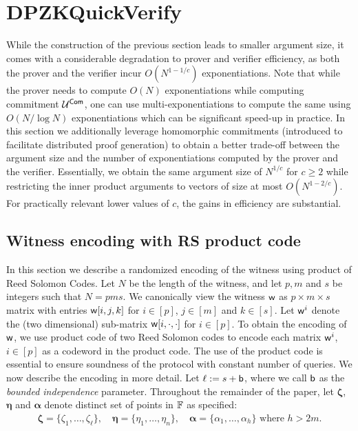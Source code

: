 \newcommand{\fft}{\mathsf{FFT}}
\newcommand{\ifft}{\mathsf{IFFT}}
\newcommand{\open}{\mathsf{Open}}

\section{DPZKQuickVerify} \label{sec:quickverify}
While the construction of the previous section leads to smaller argument size,
it comes with a considerable degradation to prover and verifier efficiency, as
both the prover and the verifier incur $O(N^{1-1/c})$ exponentiations. Note
that while the prover needs to compute $O(N)$ exponentiations while computing
commitment $\mathcal{U}^{\mathsf{Com}}$, one can use multi-exponentiations to compute the same
using $O(N/\log{N})$ exponentiations which can be significant speed-up in
practice. In this section we additionally leverage homomorphic commitments
(introduced to facilitate distributed proof generation) to obtain a better
trade-off between the argument size and the number of exponentiations computed
by the prover and the verifier. Essentially, we obtain the same argument size
of $N^{1/c}$ for $c\geq 2$ while restricting the inner product arguments to
vectors of size at most $O(N^{1-2/c})$. For practically relevant lower values
of $c$, the gains in efficiency are substantial.
   

\subsection{Witness encoding with RS product code}\label{sec:witencoding}
In this section we describe a randomized encoding of the witness using product
of Reed Solomon Codes. Let $N$ be the length of the witness, and let $p,m$ and
$s$ be integers such that $N=pms$. We canonically view the
witness $\mathsf{w}$ 
as $p\times m\times s$ matrix with entries $\mathsf{w}[i,j,k]$ for $i\in [p]$,
$j\in [m]$ and $k\in [s]$. Let $\mathsf{w}^i$ denote the (two dimensional) sub-matrix
$\mathsf{w}[i,\cdot,\cdot]$ for $i\in [p]$. To obtain the encoding of
$\mathsf{w}$, we use product code of two Reed Solomon codes to encode each matrix
$\mathsf{w}^i$,
$i\in [p]$ as a codeword in the product code. The use of the product code is
essential to ensure soundness of the protocol with constant number of queries.
We now describe the encoding in more detail. Let $\ell := s + \mathsf{b}$, where we
call $\mathsf{b}$ as the {\em bounded independence} parameter. 
Throughout the remainder of the paper, let $\bm{\zeta}$, $\bm{\eta}$ and
$\bm{\alpha}$ denote distinct set of points in $\mathbb{F}$ as specified:
\begin{align}\label{eq:points}
\bm{\zeta} =\{\zeta_1,\ldots,\zeta_{\ell}\},\quad 
\bm{\eta}  = \{\eta_1,\ldots,\eta_n \},\quad
\bm{\alpha} = \{\alpha_1,\ldots,\alpha_{h}\} \text{ where } h>2m. 
\end{align}

